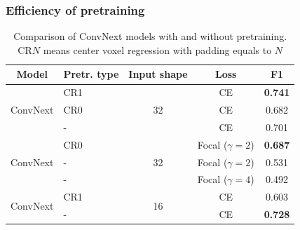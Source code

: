 \documentclass{beamer}
\begin{document}
\begin{frame}
    \frametitle{Efficiency of pretraining}
    \begin{table}[ht]
        \centering
        \begin{tabular}{|c| >{\centering\arraybackslash}p{1cm}|c|c|c| }
            \hline
            \textbf{Model}            & \textbf{Pretr. type} & \textbf{Input shape} & \textbf{Loss}        & \textbf{F1}    \\
            \hline
            \multirow{3}{*}{ConvNext} & CR1                  & \multirow{3}{*}{32}  & CE                   & \textbf{0.741} \\
                                      & CR0                  &                      & CE                   & 0.682          \\
                                      & -                    &                      & CE                   & 0.701          \\
            \hline
            \multirow{3}{*}{ConvNext} & CR0                  & \multirow{3}{*}{32 } & Focal (\(\gamma=2\)) & \textbf{0.687} \\
                                      & -                    &                      & Focal (\(\gamma=2\)) & 0.531          \\
                                      & -                    &                      & Focal (\(\gamma=4\)) & 0.492          \\
            \hline
            \multirow{2}{*}{ConvNext} & CR1                  & \multirow{2}{*}{16 } & CE                   & 0.603          \\
                                      & -                    &                      & CE                   & \textbf{0.728} \\
            \hline
        \end{tabular}
        \caption{Comparison of ConvNext models with and without pretraining. CR\(N\) means center voxel regression
            with padding equals to \(N\)}
        \label{tab:pretraining_comparison}
    \end{table}
\end{frame}
\end{document}
